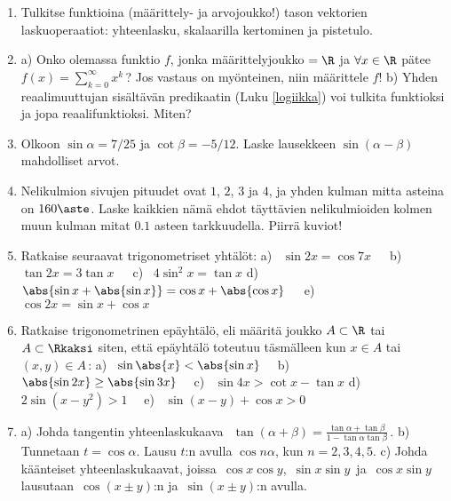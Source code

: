 \begin{enumerate}
\item
Tulkitse funktioina (määrittely- ja arvojoukko!) tason vektorien laskuoperaatiot: yhteenlasku,
skalaarilla kertominen ja pistetulo.
 
\item
a) Onko olemassa funktio $f$, jonka määrittelyjoukko $=\R$ ja $\forall x\in\R$ pätee
$f(x)=\sum_{k=0}^\infty x^k$\,? Jos vastaus on myönteinen, niin määrittele $f$! \newline 
b) Yhden reaalimuuttujan sisältävän predikaatin (Luku \ref{logiikka}) voi tulkita funktioksi
ja jopa reaalifunktioksi. Miten?

\item
Olkoon $\sin\alpha=7/25$ ja $\cot\beta=-5/12$. Laske lausekkeen $\sin(\alpha-\beta)$ mahdolliset
arvot.

\item
Nelikulmion sivujen pituudet ovat $1$, $2$, $3$ ja $4$, ja yhden kulman mitta asteina on
$160\aste$. Laske kaikkien nämä ehdot täyttävien nelikulmioiden kolmen muun kulman mitat
$0.1$ asteen tarkkuudella. Piirrä kuviot! 

\item
Ratkaise seuraavat trigonometriset yhtälöt: \newline
a) \ $\sin 2x=\cos 7x\quad\,$ b) \ $\tan 2x=3\tan x\quad\,$ 
c) \ $4\sin^2 x=\tan x$ \newline
d) \ $\abs{\sin x+\abs{\sin x}}=\cos x+\abs{\cos x}\quad\,$ e) \ $\cos 2x=\sin x + \cos x$ 

\item
Ratkaise trigonometrinen epäyhtälö, eli määritä joukko $A\subset\R$ tai $A\subset\Rkaksi$
siten, että epäyhtälö toteutuu täsmälleen kun $x \in A$ tai $(x,y) \in A$\,: \newline
a) \ $\sin\abs{x}<\abs{\sin x}\quad$ b) \ $\abs{\sin 2x}\ge\abs{\sin 3x}\quad$
c) \ $\sin 4x>\cot x-\tan x$ \newline
d) \ $2\sin(x-y^2)>1 \quad$ e) \ $\sin(x-y)+\cos x>0$

\item
a) Johda tangentin yhteenlaskukaava $\ \displaystyle{\,\tan(\alpha + \beta)
   =\frac{\tan\alpha + \tan\beta}{1-\tan\alpha\tan\beta}\,}.$ \vspace{1mm}\newline
b) Tunnetaan $t=\cos\alpha$. Lausu $t$:n avulla $\cos n\alpha$, kun $n=2,3,4,5$. \newline
c) Johda käänteiset yhteenlaskukaavat, joissa $\,\cos x \cos y$, $\,\sin x\sin y\,$ ja \newline
$\,\cos x\sin y\,$ lausutaan $\,\cos{(x\pm y)}$:n ja $\,\sin{(x\pm y)}$:n avulla.


\end{enumerate}

